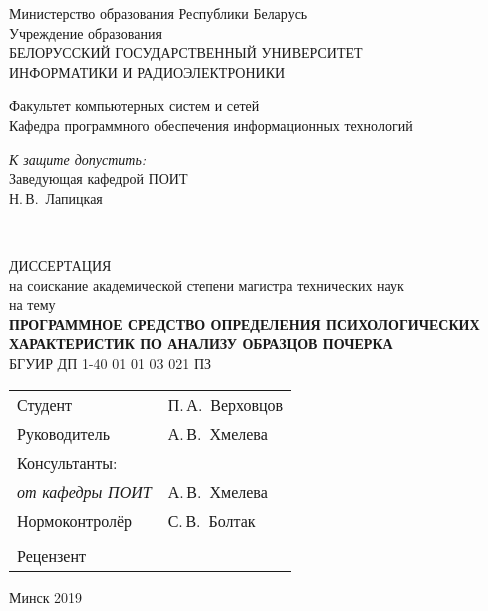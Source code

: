 \begin{titlepage}
  \begin{center}
    Министерство образования Республики Беларусь\\[1em]
    Учреждение образования\\
    БЕЛОРУССКИЙ ГОСУДАРСТВЕННЫЙ УНИВЕРСИТЕТ \\
    ИНФОРМАТИКИ И РАДИОЭЛЕКТРОНИКИ\\[1em]

    \begin{flushleft}
        Факультет компьютерных систем и сетей\\
        Кафедра программного обеспечения информационных технологий
    \end{flushleft}

    \begin{flushright}
      \begin{minipage}{0.4\textwidth}
        \textit{К защите допустить:}\\[0.8 em]
        Заведующая кафедрой ПОИТ\\[0.45 em]
        \underline{\hspace*{2.8 cm}} Н.\,В.~Лапицкая
      \end{minipage}\\[2.2 em]
    \end{flushright}


    {ДИССЕРТАЦИЯ}\\
    {на соискание академической степени магистра технических наук}\\
    {на тему}\\[1em]
    \textbf{ПРОГРАММНОЕ СРЕДСТВО ОПРЕДЕЛЕНИЯ ПСИХОЛОГИЧЕСКИХ ХАРАКТЕРИСТИК ПО АНАЛИЗУ ОБРАЗЦОВ ПОЧЕРКА}\\[1em]


    {БГУИР ДП 1-40 01 01 03 021 ПЗ}\\[2em]

    \begin{tabular}{ p{}p{} }
      Студент & П.\,А.~Верховцов \\
      Руководитель & А.\,В.~Хмелева \\
      Консультанты: &\\
      \hspace*{3 ex}\emph{от кафедры ПОИТ} & А.\,В.~Хмелева \\
      Нормоконтролёр & С.\,В.~Болтак\\
      & \\
      Рецензент &
    \end{tabular}

    \vfill
    {\normalsize Минск 2019}
  \end{center}
\end{titlepage}
